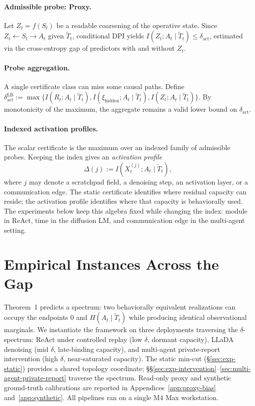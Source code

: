 \documentclass{article}
\begin{document}
\paragraph{Admissible probe: Proxy.}
Let $Z_t = f(S_t)$ be a readable coarsening of the operative state. Since $Z_t \leftarrow S_t \to A_t$ given $\tilde T_t$, conditional DPI yields $I(Z_t; A_t \mid \tilde T_t) \leq \delta_\text{act}$, estimated via the cross-entropy gap of predictors with and without $Z_t$.

\paragraph{Probe aggregation.}
A single certificate class can miss some causal paths.  Define $\delta_\text{act}^\text{LB} := \max\{ I(R_t; A_t \mid \tilde T_t), I(\xi_\text{hidden}; A_t \mid \tilde T_t), I(Z_t; A_t \mid \tilde T_t) \}$.  By monotonicity of the maximum, the aggregate remains a valid lower bound on $\delta_\text{act}$.

\paragraph{Indexed activation profiles.}
The scalar certificate is the maximum over an indexed family of admissible probes. Keeping the index gives an \emph{activation profile}
\[
  \Delta(j) := I(X_t^{(j)}; A_t \mid \tilde T_t),
\]
where $j$ may denote a scratchpad field, a denoising step, an activation layer, or a communication edge.  The static certificate identifies where residual capacity can reside; the activation profile identifies where that capacity is behaviorally used.  The experiments below keep this algebra fixed while changing the index: module in ReAct, time in the diffusion LM, and communication edge in the multi-agent setting.

\section{Empirical Instances Across the Gap}
\label{sec:empirical}

Theorem~1 predicts a spectrum: two behaviorally equivalent realizations can occupy the endpoints $0$ and $H(A_t \mid \tilde T_t)$ while producing identical observational marginals. We instantiate the framework on three deployments traversing the $\delta$-spectrum: ReAct under controlled replay (low $\delta$, dormant capacity), LLaDA denoising (mid $\delta$, late-binding capacity), and multi-agent private-report intervention (high $\delta$, near-saturated capacity). The static min-cut (\S\ref{sec:exp-static}) provides a shared topology coordinate; \S\S\ref{sec:exp-intervention}--\ref{sec:multi-agent-private-report} traverse the spectrum. Read-only proxy and synthetic ground-truth calibrations are reported in Appendices~\ref{app:proxy-bias} and~\ref{app:synthetic}. All pipelines ran on a single M4 Max workstation.
\end{document}
